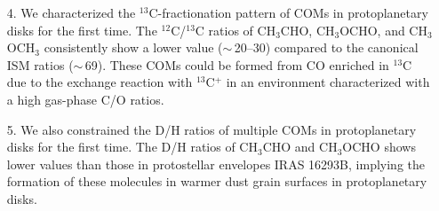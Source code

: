 \documentclass[linenumbers, twocolumn, twocolappendix, astrosymb, times]{aastex631}
\newcommand{\methanol}{CH$_3$OH\xspace}
\newcommand{\acetaldehyde}{CH$_3$CHO\xspace}
\newcommand{\methylformate}{CH$_3$OCHO\xspace}
\newcommand{\dimethylether}{CH$_3$OCH$_3$\xspace}
\begin{document}
\begin{enumerate}
    \item[4.] We characterized the $^{13}$C-fractionation pattern of COMs in protoplanetary disks for the first time. The $^{12}$C/$^{13}$C ratios of \acetaldehyde, \methylformate, and \dimethylether consistently show a lower value ($\sim$\,20--30) compared to the canonical ISM ratios ($\sim$\,69). These COMs could be formed from CO enriched in $^{13}$C due to the exchange reaction with $^{13}$C$^+$ in an environment characterized with a high gas-phase C/O ratios.
    \item[5.]  We also constrained the D/H ratios of multiple COMs in protoplanetary disks for the first time. The D/H ratios of \acetaldehyde and \methylformate shows lower values than those in protostellar envelopes IRAS 16293B, implying the formation of these molecules in warmer dust grain surfaces in protoplanetary disks. 
\end{enumerate}
\end{document}
